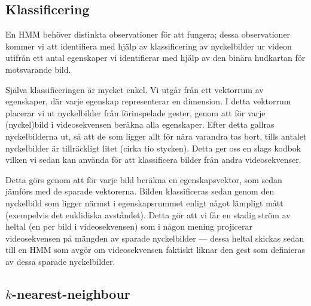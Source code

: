 \documentclass[../rapport_MVEX01-11-05]{subfiles}
\begin{document}
\subsection{Klassificering}
En HMM behöver distinkta observationer för att fungera; dessa
observationer kommer vi att identifiera med hjälp av klassificering av
nyckelbilder ur videon utifrån ett antal egenskaper vi identifierar
med hjälp av den binära hudkartan för motsvarande bild.

Själva klassificeringen är mycket enkel. Vi utgår från ett vektorrum
av egenskaper, där varje egenskap representerar en dimension. I detta
vektorrum placerar vi ut nyckelbilder från förinspelade gester, genom
att för varje (nyckel)bild i videosekvensen beräkna alla egenskaper.
Efter detta gallras nyckelbilderna ut, så att de som ligger allt för
nära varandra tas bort, tills antalet nyckelbilder är tillräckligt
litet (cirka tio stycken).
Detta ger oss en slags kodbok vilken vi sedan kan använda för att
klassificera bilder från andra videosekvenser. 


Detta görs genom att för varje bild beräkna en egenskapsvektor, som
sedan jämförs med de sparade vektorerna. Bilden klassificeras sedan
genom den nyckelbild som ligger närmst i egenskapsrummet enligt något
lämpligt mått (exempelvis det euklidiska avståndet). Detta gör att vi
får en stadig ström av heltal (en per bild i videosekvensen) som i
någon mening projicerar videosekvensen på mängden av sparade
nyckelbilder --- dessa heltal skickas sedan till en HMM som avgör om
videosekvensen faktiskt liknar den gest som definieras av dessa
sparade nyckelbilder.

\subsection{$k$-nearest-neighbour}

%


\end{document}
